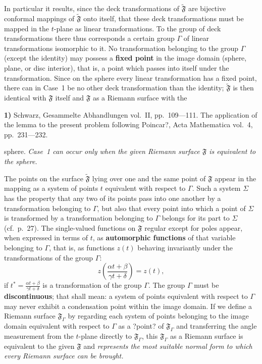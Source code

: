 \documentclass{article}
\begin{document}
In particular it results, since the deck transformations of $\widetilde{\mathfrak{F}}$ are bijective conformal mappings of $\widetilde{\mathfrak{F}}$ onto itself, that these deck transformations must be mapped in the $t$-plane as linear transformations. To the group of deck transformations there thus corresponds a certain group $\varGamma$ of linear transformations isomorphic to it. No transformation belonging to the group $\varGamma$ (except the identity) may possess a \textbf{fixed point} in the image domain (sphere, plane, or disc interior), that is, a point which passes into itself under the transformation. Since on the sphere every linear transformation has a fixed point, there can in Case~1 be no other deck transformation than the identity; $\widetilde{\mathfrak{F}}$ is then identical with $\mathfrak{F}$ itself and $\mathfrak{F}$ as a Riemann surface with the

\textbf{1)} Schwarz, Gesammelte Abhandlungen vol.~II, pp.~109---111. The application of the lemma to the present problem following Poincar?, Acta Mathematica vol.~4, pp.~231---232.

sphere. \emph{Case~1 can occur only when the given Riemann surface $\mathfrak{F}$ is equivalent to the sphere.}

The points on the surface $\widetilde{\mathfrak{F}}$ lying over one and the same point of $\mathfrak{F}$ appear in the mapping as a system of points $t$ equivalent with respect to $\varGamma$. Such a system $\Sigma$ has the property that any two of its points pass into one another by a transformation belonging to $\varGamma$, but also that every point into which a point of $\Sigma$ is transformed by a transformation belonging to $\varGamma$ belongs for its part to $\Sigma$ (cf.\ p.~27). The single-valued functions on $\mathfrak{F}$ regular except for poles appear, when expressed in terms of $t$, as \textbf{automorphic functions} of that variable belonging to $\varGamma$, that is, as functions $z(t)$ behaving invariantly under the transformations of the group $\varGamma$:
\[ z \left( \frac{\alpha t + \beta}{\gamma t + \delta} \right) = z(t), \]
if $t^* = \frac{\alpha t + \beta}{\gamma t + \delta}$ is a transformation of the group $\varGamma$. The group $\varGamma$ must be \textbf{discontinuous}; that shall mean: a system of points equivalent with respect to $\varGamma$ may never exhibit a condensation point within the image domain. If we define a Riemann surface $\mathfrak{F}_\varGamma$ by regarding each system of points belonging to the image domain equivalent with respect to $\varGamma$ as a ?point? of $\mathfrak{F}_\varGamma$ and transferring the angle measurement from the $t$-plane directly to $\mathfrak{F}_\varGamma$, this $\mathfrak{F}_\varGamma$ as a Riemann surface is equivalent to the given $\mathfrak{F}$ and \emph{represents the most suitable normal form to which every Riemann surface can be brought.}
\end{document}
